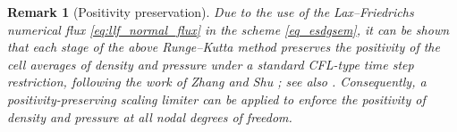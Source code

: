 \documentclass[fleqn,11pt]{amsart}
\newtheorem{remark}{Remark}[section]
\begin{document}
\begin{remark}[Positivity preservation]
Due to the use of the Lax--Friedrichs numerical flux \eqref{eq:llf_normal_flux} in the scheme \eqref{eq_esdgsem}, it can be shown that each stage of the above Runge--Kutta method preserves the positivity of the cell averages of density and pressure under a standard CFL-type time step restriction, following the work of Zhang and Shu \cite{zhang2010positivity}; see also \cite{chen2017entropy}. Consequently, a positivity-preserving scaling limiter \cite{zhang2010positivity} can be applied to enforce the positivity of density and pressure at all nodal degrees of freedom.
\end{remark}

\end{document}
